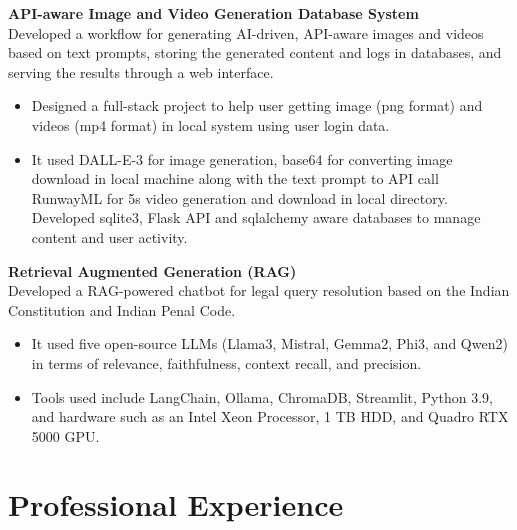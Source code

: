\documentclass[10pt,a4paper]{article}
\begin{document}
	\textbf{API-aware Image and Video Generation Database System} \hfill \textit{}\\
	Developed a workflow for generating AI-driven, API-aware images and videos based on text prompts, storing the generated content and logs in databases, and serving the results through a web interface.
	\begin{itemize}[leftmargin=0.2in]
		\item Designed a full-stack project to help user getting image (png format) and videos (mp4 format) in local system using user login data.
		\item It used DALL-E-3 for image generation, base64 for converting image download in local machine along with the text prompt to API call RunwayML for 5s video generation and download in local directory. Developed sqlite3, Flask API and sqlalchemy aware databases to manage content and user activity. 
		
	\end{itemize}
	
	\textbf{Retrieval Augmented Generation (RAG)} \hfill \textit{}\\
	Developed a RAG-powered chatbot for legal query resolution based on the Indian Constitution and Indian Penal Code.
	\begin{itemize}[leftmargin=0.2in]
		\item It used five open-source LLMs (Llama3, Mistral, Gemma2, Phi3, and Qwen2) in terms of relevance, faithfulness, context recall, and precision. 
		\item Tools used include LangChain, Ollama, ChromaDB, Streamlit, Python 3.9, and hardware such as an Intel Xeon Processor, 1 TB HDD, and Quadro RTX 5000 GPU. 
		
	\end{itemize}
	
	\section*{Professional Experience}
	
\end{document}
